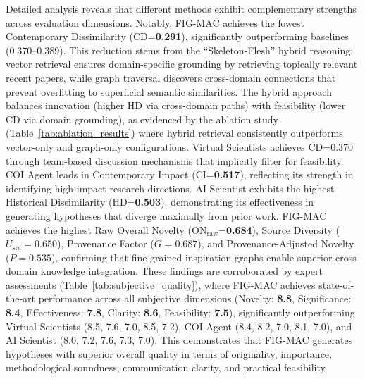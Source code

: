 \documentclass[runningheads]{llncs}
\begin{document}
Detailed analysis reveals that different methods exhibit complementary strengths across evaluation dimensions. Notably, FIG-MAC achieves the lowest Contemporary Dissimilarity (CD=\textbf{0.291}), significantly outperforming baselines (0.370--0.389). This reduction stems from the ``Skeleton-Flesh'' hybrid reasoning: vector retrieval ensures domain-specific grounding by retrieving topically relevant recent papers, while graph traversal discovers cross-domain connections that prevent overfitting to superficial semantic similarities. The hybrid approach balances innovation (higher HD via cross-domain paths) with feasibility (lower CD via domain grounding), as evidenced by the ablation study (Table~\ref{tab:ablation_results}) where hybrid retrieval consistently outperforms vector-only and graph-only configurations. Virtual Scientists achieves CD=0.370 through team-based discussion mechanisms that implicitly filter for feasibility. COI Agent leads in Contemporary Impact (CI=\textbf{0.517}), reflecting its strength in identifying high-impact research directions. AI Scientist exhibits the highest Historical Dissimilarity (HD=\textbf{0.503}), demonstrating its effectiveness in generating hypotheses that diverge maximally from prior work. FIG-MAC achieves the highest Raw Overall Novelty (ON$_{\text{raw}}$=\textbf{0.684}), Source Diversity ($U_{\text{src}}=\mathbf{0.650}$), Provenance Factor ($G=\mathbf{0.687}$), and Provenance-Adjusted Novelty ($P=\mathbf{0.535}$), confirming that fine-grained inspiration graphs enable superior cross-domain knowledge integration. These findings are corroborated by expert assessments (Table~\ref{tab:subjective_quality}), where FIG-MAC achieves state-of-the-art performance across all subjective dimensions (Novelty: \textbf{8.8}, Significance: \textbf{8.4}, Effectiveness: \textbf{7.8}, Clarity: \textbf{8.6}, Feasibility: \textbf{7.5}), significantly outperforming Virtual Scientists (8.5, 7.6, 7.0, 8.5, 7.2), COI Agent (8.4, 8.2, 7.0, 8.1, 7.0), and AI Scientist (8.0, 7.2, 7.6, 7.3, 7.0). This demonstrates that FIG-MAC generates hypotheses with superior overall quality in terms of originality, importance, methodological soundness, communication clarity, and practical feasibility.
\end{document}
